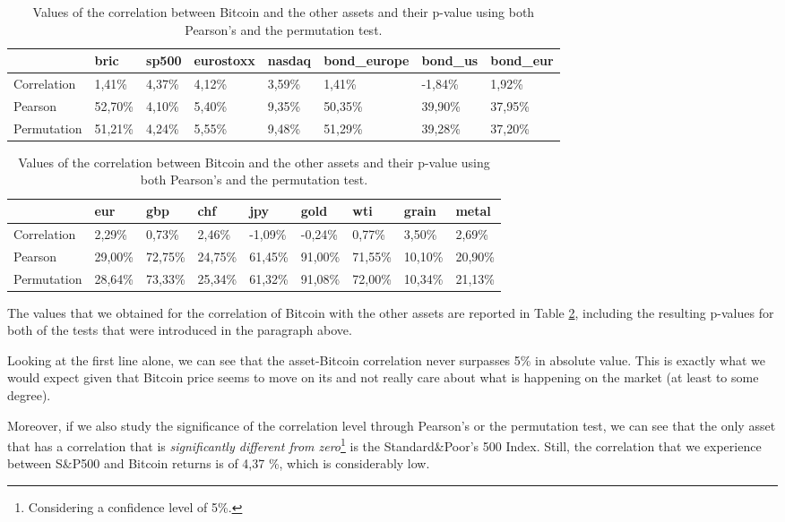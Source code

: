  \begin{table}
 \begin{tabular}{llllllll}
 	
 	\toprule
 	& bric & sp500 & eurostoxx & nasdaq & bond\_europe & bond\_us & bond\_eur \\
 	\midrule
 	Correlation & 1,41\% & 4,37\% & 4,12\% & 3,59\% & 1,41\% & -1,84\% & 1,92\% \\
 	Pearson & 52,70\% & 4,10\% & 5,40\% & 9,35\% & 50,35\% & 39,90\% & 37,95\% \\
 	Permutation & 51,21\% & 4,24\% & 5,55\% & 9,48\% & 51,29\% & 39,28\% & 37,20\% \\
 	
 	\bottomrule
 \end{tabular}
 
 \begin{tabular}{lllllllll}
 	
 	\toprule
 	& eur & gbp & chf & jpy & gold & wti & grain & metal \\
 	\midrule
 	Correlation & 2,29\% & 0,73\% & 2,46\% & -1,09\% & -0,24\% & 0,77\% & 3,50\% & 2,69\% \\
 	Pearson & 29,00\% & 72,75\% & 24,75\% & 61,45\% & 91,00\% & 71,55\% & 10,10\% & 20,90\% \\
 	Permutation & 28,64\% & 73,33\% & 25,34\% & 61,32\% & 91,08\% & 72,00\% & 10,34\% & 21,13\% \\
 	
 	\bottomrule
 \end{tabular}
 
 	\caption{Values of the correlation between Bitcoin and the other assets and their p-value using both Pearson's and the permutation test. }
\label{tab:corr_significance}
\end{table}

The values that we obtained for the correlation of Bitcoin with the other assets are reported in Table \ref{tab:corr_significance}, including the resulting p-values for both of the tests that were introduced in the paragraph above.

Looking at the first line alone, we can see that the asset-Bitcoin correlation never surpasses 5\%  in absolute value. This is exactly what we would expect given that Bitcoin price seems to move on its and not really care about what is happening on the market (at least to some degree). 

Moreover, if we also study the significance of the correlation level through Pearson's or the permutation test, we can see that the only asset that has a correlation that is \textit{significantly different from zero}\footnote{Considering a confidence level of 5\%.} is the Standard\&Poor's 500 Index. Still, the correlation that we experience between S\&P500 and Bitcoin returns is of 4,37 \%, which is considerably low. 

